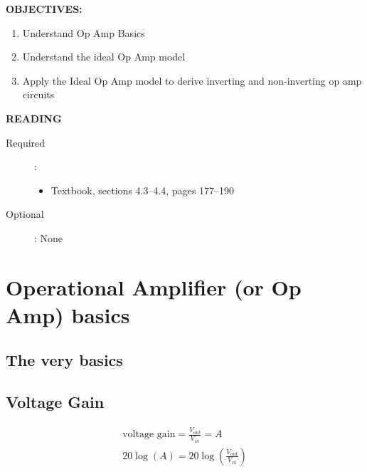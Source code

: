\documentclass{handout}
\begin{document}
\maketitle

\textbf{OBJECTIVES:}
\begin{enumerate}
\item Understand Op Amp Basics
\item Understand the ideal Op Amp model
\item Apply the Ideal Op Amp model to derive inverting and non-inverting op amp circuits
\end{enumerate}

\textbf{READING}
\begin{description}
\item [Required]:
\begin{itemize}
\item  Textbook, sections 4.3--4.4, pages 177--190
\end{itemize}
\item [Optional]: None
\end{description}

\section{Operational Amplifier (or Op Amp) basics}
\subsection{The very basics}

\subsection{Voltage Gain}

\begin{eqnarray}
	\text{voltage gain} = \frac{V_{out}}{V_{in}} = A \\
	20 \log(A) = 20 \log(\frac{V_{out}}{V_{in}})
\end{eqnarray}
\end{document}
